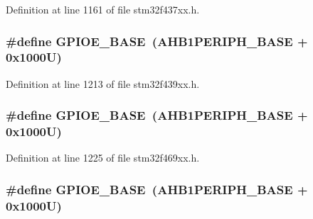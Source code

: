 Definition at line 1161 of file stm32f437xx.\+h.

\subsubsection[{\texorpdfstring{G\+P\+I\+O\+E\+\_\+\+B\+A\+SE}{GPIOE_BASE}}]{\setlength{\rightskip}{0pt plus 5cm}\#define G\+P\+I\+O\+E\+\_\+\+B\+A\+SE~({\bf A\+H\+B1\+P\+E\+R\+I\+P\+H\+\_\+\+B\+A\+SE} + 0x1000\+U)}\hypertarget{group___peripheral__memory__map_gab487b1983d936c4fee3e9e88b95aad9d}{}\label{group___peripheral__memory__map_gab487b1983d936c4fee3e9e88b95aad9d}


Definition at line 1213 of file stm32f439xx.\+h.

\subsubsection[{\texorpdfstring{G\+P\+I\+O\+E\+\_\+\+B\+A\+SE}{GPIOE_BASE}}]{\setlength{\rightskip}{0pt plus 5cm}\#define G\+P\+I\+O\+E\+\_\+\+B\+A\+SE~({\bf A\+H\+B1\+P\+E\+R\+I\+P\+H\+\_\+\+B\+A\+SE} + 0x1000\+U)}\hypertarget{group___peripheral__memory__map_gab487b1983d936c4fee3e9e88b95aad9d}{}\label{group___peripheral__memory__map_gab487b1983d936c4fee3e9e88b95aad9d}


Definition at line 1225 of file stm32f469xx.\+h.

\subsubsection[{\texorpdfstring{G\+P\+I\+O\+E\+\_\+\+B\+A\+SE}{GPIOE_BASE}}]{\setlength{\rightskip}{0pt plus 5cm}\#define G\+P\+I\+O\+E\+\_\+\+B\+A\+SE~({\bf A\+H\+B1\+P\+E\+R\+I\+P\+H\+\_\+\+B\+A\+SE} + 0x1000\+U)}\hypertarget{group___peripheral__memory__map_gab487b1983d936c4fee3e9e88b95aad9d}{}\label{group___peripheral__memory__map_gab487b1983d936c4fee3e9e88b95aad9d}


